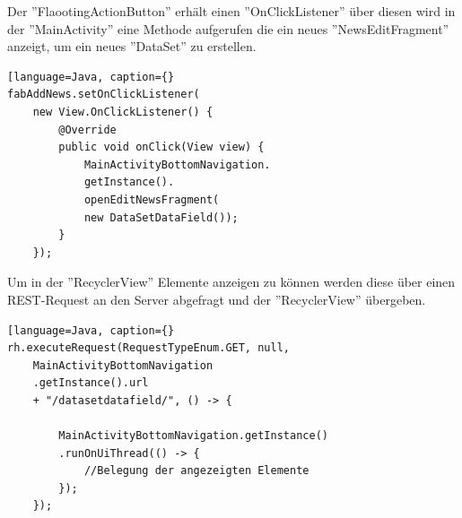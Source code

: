 Der ''FlaootingActionButton'' erhält einen ''OnClickListener'' über diesen wird in der ''MainActivity'' eine Methode aufgerufen die ein neues ''NewsEditFragment'' anzeigt, um ein neues ''DataSet'' zu erstellen. 
 \begin{lstlisting}[language=Java, caption={}
fabAddNews.setOnClickListener(
	new View.OnClickListener() {
        @Override
        public void onClick(View view) {
            MainActivityBottomNavigation.
            getInstance().
            openEditNewsFragment(
            new DataSetDataField());
        }
    });
\end{lstlisting}
Um in der ''RecyclerView'' Elemente anzeigen zu können werden diese über einen REST-Request an den Server abgefragt und der ''RecyclerView'' übergeben.
\begin{lstlisting}[language=Java, caption={}
rh.executeRequest(RequestTypeEnum.GET, null,
	MainActivityBottomNavigation
	.getInstance().url 
	+ "/datasetdatafield/", () -> {

        MainActivityBottomNavigation.getInstance()
        .runOnUiThread(() -> {
            //Belegung der angezeigten Elemente
        });
    });
\end{lstlisting}
